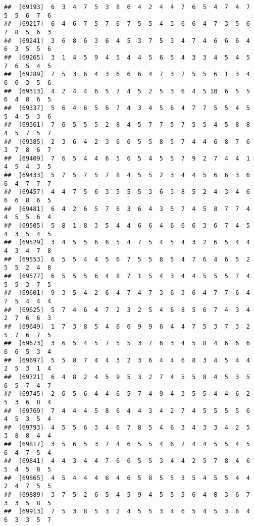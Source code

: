 \documentclass[
]{book}
\begin{document}
\begin{verbatim}
##  [69193]  6  3  4  7  5  3  8  6  4  2  4  4  7  6  5  4  7  4  7  5  5  6  7  6
##  [69217]  6  4  6  7  5  7  6  7  5  5  4  3  6  6  4  7  3  5  6  7  8  5  6  3
##  [69241]  3  6  8  6  3  6  4  5  3  7  5  3  4  7  4  6  6  6  4  6  3  5  5  6
##  [69265]  3  1  4  5  9  4  5  4  4  5  6  5  4  3  3  4  5  4  5  7  6  5  4  5
##  [69289]  7  5  3  6  4  3  6  6  6  4  7  3  7  5  5  6  1  3  4  6  6  3  5  6
##  [69313]  4  2  4  4  6  5  7  4  5  2  5  3  6  4  5 10  6  5  5  6  4  8  6  5
##  [69337]  5  6  4  6  5  6  7  4  3  4  5  6  4  7  7  5  5  4  5  5  4  5  3  6
##  [69361]  7  6  5  5  5  2  8  4  5  7  7  5  7  5  5  4  5  8  8  4  5  7  5  7
##  [69385]  2  3  6  4  2  3  6  6  5  5  8  5  7  4  4  6  8  7  6  3  7  8  6  7
##  [69409]  7  6  5  4  4  6  5  6  5  4  5  5  7  9  2  7  4  4  1  4  5  4  3  5
##  [69433]  5  7  5  7  5  7  8  4  5  5  2  3  4  4  5  6  6  3  6  6  4  7  7  7
##  [69457]  4  4  7  5  6  3  5  5  5  3  6  3  8  5  2  4  3  4  6  6  6  8  6  5
##  [69481]  6  4  2  6  5  7  6  3  6  4  3  5  7  4  5  8  7  7  4  4  5  5  6  4
##  [69505]  5  8  1  8  3  5  4  4  6  6  4  6  6  6  3  6  7  4  5  4  3  5  4  5
##  [69529]  3  4  5  5  6  6  5  4  7  5  4  5  4  3  2  6  5  4  4  4  3  4  7  8
##  [69553]  6  5  5  4  4  5  6  7  5  5  8  5  4  7  6  4  6  5  2  5  5  2  4  8
##  [69577]  6  5  5  5  6  4  8  7  1  5  4  3  4  4  5  5  5  7  4  5  5  3  7  5
##  [69601]  9  3  5  4  2  6  4  7  4  7  3  6  3  6  4  7  7  6  4  7  5  4  4  4
##  [69625]  5  7  4  6  4  7  2  3  2  5  4  6  8  5  6  7  4  3  4  2  7  6  6  3
##  [69649]  1  7  3  8  5  4  6  6  9  9  6  4  4  7  5  3  7  3  2  5  7  6  7  5
##  [69673]  3  6  5  4  5  7  5  5  3  7  6  3  4  5  8  4  6  6  6  6  6  5  3  4
##  [69697]  5  5  8  7  4  4  3  2  3  6  4  4  6  8  3  4  5  4  4  2  5  3  1  4
##  [69721]  6  4  8  2  4  5  9  5  3  2  7  4  5  5  8  4  5  3  5  6  5  7  4  7
##  [69745]  2  6  5  6  4  4  6  5  7  4  9  4  3  5  5  4  4  6  2  5  3  6  8  4
##  [69769]  7  4  4  4  5  8  6  4  4  3  4  2  7  4  5  5  5  5  6  4  5  3  5  4
##  [69793]  4  5  5  6  3  4  6  7  8  5  4  6  3  4  3  3  4  2  5  3  8  8  4  4
##  [69817]  3  5  6  5  3  7  4  6  5  5  4  6  7  4  4  5  5  4  5  6  4  7  5  4
##  [69841]  4  4  3  4  4  7  6  6  5  5  3  4  4  2  5  7  8  4  6  5  4  5  8  5
##  [69865]  4  5  4  4  4  6  4  6  5  8  5  5  3  5  4  5  5  4  4  2  4  7  5  5
##  [69889]  3  7  5  2  6  5  4  5  9  4  5  5  5  6  4  8  3  6  7  3  3  5  8  5
##  [69913]  7  5  3  8  5  3  2  4  5  5  3  4  6  5  4  5  3  6  4  6  3  3  5  7

\end{verbatim}
\end{document}
